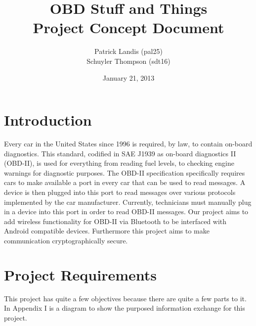 \documentclass[12pt,letterpaper]{article}
\title{
\textbf{\LARGE OBD Stuff and Things} \\
\Large Project Concept Document
}
\author{
\normalsize Patrick Landis (pal25) \\
\normalsize Schuyler Thompson (sdt16)
}
\date{\normalsize January 21, 2013}
\begin{document}
\maketitle

\section{Introduction}
Every car in the United States since 1996 is required, by law, to contain on-board diagnostics. This standard, codified in SAE J1939 as on-board diagnostics II (OBD-II), is used for everything from reading fuel levels, to checking engine warnings for diagnostic purposes. The OBD-II specification specifically requires cars to make available a port in every car that can be used to read messages. A device is then plugged into this port to read messages over various protocols implemented by the car manufacturer. Currently, technicians must manually plug in a device into this port in order to read OBD-II messages. Our project aims to add wireless functionality for OBD-II via Bluetooth to be interfaced with Android compatible devices. Furthermore this project aims to make communication cryptographically secure.


\section{Project Requirements}
This project has quite a few objectives because there are quite a few parts to it. In Appendix I is a diagram to show the purposed information exchange for this project.
\end{document}
